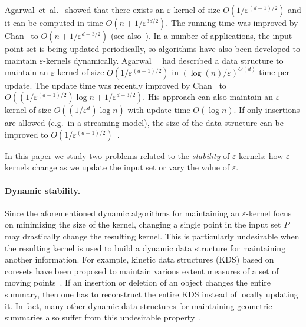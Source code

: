 \documentclass[11pt]{myclass}
\newcommand{\eps}{\varepsilon}
\begin{document}
Agarwal~{et~al.}~\cite{AHV04} showed that there exists
an $\eps$-kernel of size $O(1/\eps^{(d-1)/2})$ and it can be
computed in time $O(n+1/\eps^{3d/2})$. The running time was improved 
by Chan~\cite{Cha06} to $O(n + 1 / \eps^{d-3/2})$ (see
also~\cite{YAPV04}).
In a number of applications, the input point set is being updated
periodically, so algorithms have also been developed to
maintain $\eps$-kernels dynamically.
Agarwal~\etal~\cite{AHV04} had described a data structure to maintain
 an $\eps$-kernel of size $O(1/\eps^{(d-1)/2})$ 
in $(\log (n)/\eps)^{O(d)}$ time per update.
The update time was recently improved by Chan~\cite{Cha08} to
$O((1/\eps^{(d-1)/2})\log n + 1/\eps^{d-3/2})$. His approach can 
also maintain an $\eps$-kernel of size $O((1/\eps^d)\log n)$ with 
update time $O(\log n)$.  If only insertions are allowed (e.g.\ in a streaming model),
the size of the data structure can be improved to 
$O(1/\eps^{(d-1)/2})$~\cite{AY07,ZZ08}.


In this paper we study two problems related to the \emph{stability} of 
$\eps$-kernels: how $\eps$-kernels change as we update the input set or vary
the value of $\eps$.


\paragraph{Dynamic stability.}
Since the aforementioned dynamic algorithms for maintaining an
$\eps$-kernel focus on minimizing the size of the
kernel, changing a single point in the input set $P$ may 
drastically change the resulting kernel.  This is particularly 
undesirable when the resulting kernel is used to build 
a dynamic data structure for maintaining another information.
For example, kinetic data structures (KDS) based on coresets have 
been proposed to maintain various
extent measures of a set of moving points~\cite{AHV07}. If an
insertion or deletion of an object changes the entire summary,
then one has to reconstruct the entire KDS instead of locally
updating it. In fact, many other dynamic data structures for maintaining
geometric summaries also suffer from this undesirable 
property~\cite{BCEG04,HS08,STZ04}.
\end{document}
